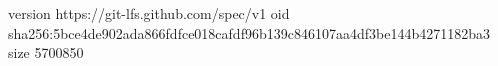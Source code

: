 version https://git-lfs.github.com/spec/v1
oid sha256:5bce4de902ada866fdfce018cafdf96b139c846107aa4df3be144b4271182ba3
size 5700850
